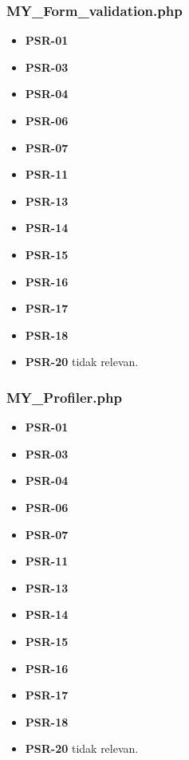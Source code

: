 \subsubsection{MY\_Form\_validation.php}
\begin{itemize}
	\item \textbf{PSR-01} 
	\item \textbf{PSR-03}
	\item \textbf{PSR-04}
	\item \textbf{PSR-06}
	\item \textbf{PSR-07}
	\item \textbf{PSR-11}
	\item \textbf{PSR-13}
	\item \textbf{PSR-14}
	\item \textbf{PSR-15}
	\item \textbf{PSR-16}
	\item \textbf{PSR-17} 
	\item \textbf{PSR-18} 
	\item \textbf{PSR-20} tidak relevan.
\end{itemize}

\subsubsection{MY\_Profiler.php}
\begin{itemize}
	\item \textbf{PSR-01} 
	\item \textbf{PSR-03}
	\item \textbf{PSR-04}
	\item \textbf{PSR-06}
	\item \textbf{PSR-07}
	\item \textbf{PSR-11}
	\item \textbf{PSR-13}
	\item \textbf{PSR-14}
	\item \textbf{PSR-15}
	\item \textbf{PSR-16}
	\item \textbf{PSR-17} 
	\item \textbf{PSR-18} 
	\item \textbf{PSR-20} tidak relevan.
\end{itemize}

